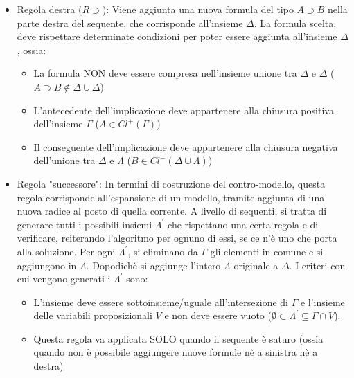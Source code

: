 \documentclass[\main/tesi.tex]{subfiles}
\begin{document}
\begin{itemize}
\begin{itemize}
\begin{itemize}
                    \end{itemize}
              \item Regola destra ($R\supset$): Viene aggiunta una nuova formula del tipo $A \supset B$ nella parte destra del sequente, che corrisponde all'insieme $\Delta$. La formula scelta, deve rispettare determinate condizioni per poter essere aggiunta all'insieme $\Delta$, ossia:
                    \begin{itemize}
                        \item La formula NON deve essere compresa nell'insieme unione tra $\Delta$ e $\Delta$ ($A \supset B \notin \Delta \cup \Delta$)
                        \item L'antecedente dell'implicazione deve appartenere alla chiusura positiva dell'insieme $\Gamma$ ($A \in Cl^{+}(\Gamma)$)
                        \item Il conseguente dell'implicazione deve appartenere alla chiusura negativa dell'unione tra $\Delta$ e $\Lambda$ ($B \in Cl^{-}(\Delta \cup \Lambda)$)
                    \end{itemize}
              \item Regola "successore": In termini di costruzione del contro-modello, questa regola corrisponde all'espansione di un modello, tramite aggiunta di una nuova radice al posto di quella corrente. A livello di sequenti, si tratta di generare tutti i possibili insiemi $\Lambda^{'}$ che rispettano una certa regola e di verificare, reiterando l'algoritmo per ognuno di essi, se ce n'è uno che porta alla soluzione. Per ogni $\Lambda^{'}$, si eliminano da $\Gamma$ gli elementi in comune e si aggiungono in $\Lambda$. Dopodichè si aggiunge l'intero $\Lambda$ originale a $\Delta$. I criteri con cui vengono generati i $\Lambda^{'}$ sono:
                    \begin{itemize}
                        \item L'insieme deve essere sottoinsieme/uguale all'intersezione di $\Gamma$ e l'insieme delle variabili proposizionali $V$ e non deve essere vuoto ($\emptyset \subset \Lambda^{'} \subseteq \Gamma \cap V$).
                        \item Questa regola va applicata SOLO quando il sequente è saturo (ossia quando non è possibile aggiungere nuove formule nè a sinistra nè a destra)
                    \end{itemize}
          \end{itemize}
\end{itemize}
\end{document}
